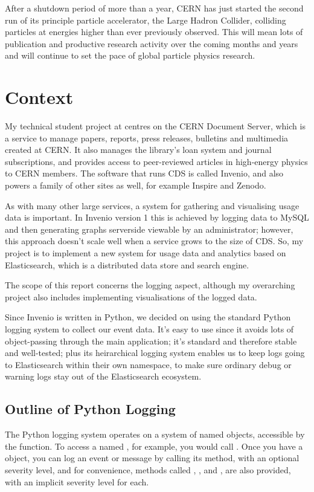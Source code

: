 \documentclass[a4paper,11pt]{article} %
\begin{document}

After a shutdown period of more than a year, CERN has just started the second
run of its principle particle accelerator, the Large Hadron Collider, colliding
particles at energies higher than ever previously observed.  This will mean
lots of publication and productive research activity over the coming months and
years and will continue to set the pace of global particle physics research.

\section{Context}
\label{sec:context}
My technical student project at centres on the CERN Document Server, which is a
service to manage papers, reports, press releases, bulletins and multimedia
created at CERN.  It also manages the library's loan system and journal
subscriptions, and provides access to peer-reviewed articles in high-energy
physics to CERN members.  The software that runs CDS is called Invenio, and
also powers a family of other sites as well, for example Inspire and Zenodo.

As with many other large services, a system for gathering and visualising usage
data is important.  In Invenio version 1 this is achieved by logging data to
MySQL and then generating graphs serverside viewable by an administrator;
however, this approach doesn't scale well when a service grows to the size of
CDS.  So, my project is to implement a new system for usage data and analytics
based on Elasticsearch, which is a distributed data store and search engine.

The scope of this report concerns the logging aspect, although my overarching
project also includes implementing visualisations of the logged data.

Since Invenio is written in Python, we decided on using the standard Python
logging system to collect our event data.  It's easy to use since it avoids
lots of object-passing through the main application; it's standard and
therefore stable and well-tested; plus its heirarchical logging system enables
us to keep logs going to Elasticsearch within their own namespace, to make sure
ordinary debug or warning logs stay out of the Elasticsearch ecosystem.

\subsection{Outline of Python Logging}
\label{sec:pythonlogging}
The Python logging system operates on a system of named 
objects, accessible by the  function.  To access a
 named , for example, you would call
.  Once you have a  object, you
can log an event or message by calling its  method, with an
optional severity level, and for convenience, methods called ,
, and ,  are also provided,
with an implicit severity level for each.
\end{document}
